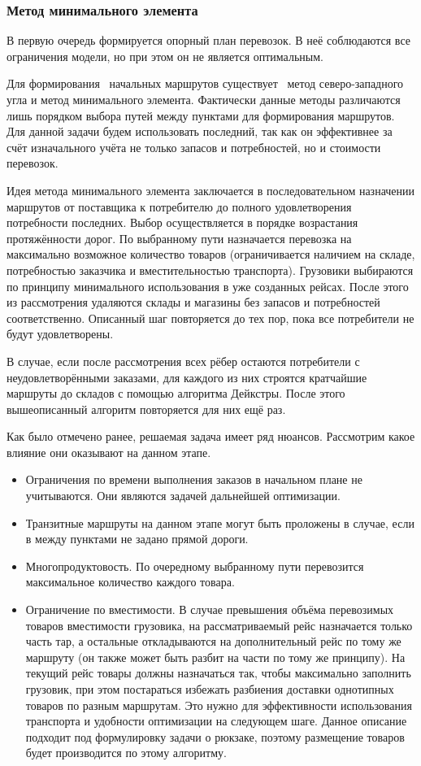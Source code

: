 	\subsubsection{Метод минимального элемента}
	В первую очередь формируется опорный план перевозок. В неё соблюдаются все ограничения модели, но при этом он не является оптимальным.
	
	Для формирования \, начальных маршрутов существует \, метод северо-западного угла и метод минимального элемента\cite{trans:comporation}. Фактически данные методы различаются лишь порядком выбора путей между пунктами для формирования маршрутов. Для данной задачи будем использовать последний, так как он эффективнее \cite{potential:polyindex} за счёт изначального учёта не только запасов и потребностей, но и стоимости перевозок.
	
	Идея метода минимального элемента заключается в последовательном назначении маршрутов от поставщика к потребителю до полного удовлетворения потребности последних. Выбор осуществляется в порядке возрастания протяжённости дорог. По выбранному пути назначается перевозка на максимально возможное количество товаров (ограничивается наличием на складе, потребностью заказчика и вместительностью транспорта). Грузовики выбираются по принципу минимального использования в уже созданных рейсах. После этого из рассмотрения удаляются склады и магазины без запасов и потребностей соответственно. Описанный шаг повторяется до тех пор, пока все потребители не будут удовлетворены.
	
	В случае, если после рассмотрения всех рёбер остаются потребители с неудовлетворёнными заказами, для каждого из них строятся кратчайшие маршруты до складов с помощью алгоритма Дейкстры\cite{alg:Corman}. После этого вышеописанный алгоритм повторяется для них ещё раз.
	
	Как было отмечено ранее, решаемая задача имеет ряд нюансов. Рассмотрим какое влияние они оказывают на данном этапе.
	\begin{itemize}
		\item Ограничения по времени выполнения заказов в начальном плане не учитываются. Они являются задачей дальнейшей оптимизации.
		\item Транзитные маршруты на данном этапе могут быть проложены в случае, если в между пунктами не задано прямой дороги.
		\item Многопродуктовость\cite{trans:polyprod}. По очередному выбранному пути перевозится максимальное количество каждого товара. 
		\item Ограничение по вместимости. В случае превышения объёма перевозимых товаров вместимости грузовика, на рассматриваемый рейс назначается только часть тар, а остальные откладываются на дополнительный рейс по тому же маршруту (он также может быть разбит на части по тому же принципу). На текущий рейс товары должны назначаться так, чтобы максимально заполнить грузовик, при этом постараться избежать разбиения доставки однотипных товаров по разным маршрутам. Это нужно для эффективности использования транспорта и удобности оптимизации на следующем шаге. Данное описание подходит под формулировку задачи о рюкзаке\cite{alg:Skiena}, поэтому размещение товаров будет производится по этому алгоритму.
	\end{itemize}
	
